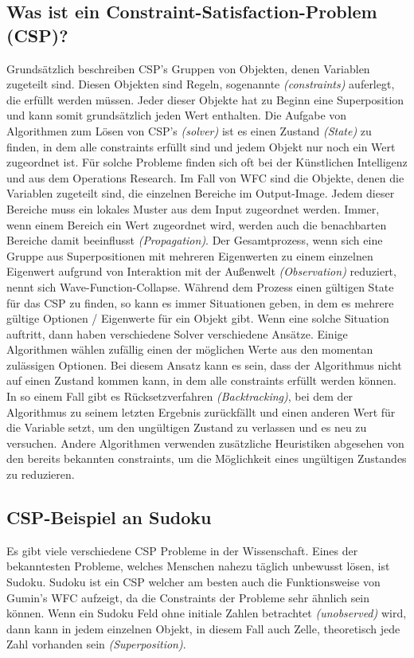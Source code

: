 \documentclass[12pt, a4paper,twoside,openright]{report} %
\begin{document}
\subsection{Was ist ein Constraint-Satisfaction-Problem {(CSP)}?}
Grundsätzlich beschreiben CSP's Gruppen von Objekten, denen Variablen zugeteilt sind.
Diesen Objekten sind Regeln, sogenannte \textit{(constraints)} auferlegt, die erfüllt werden müssen.
Jeder dieser Objekte hat zu Beginn eine Superposition und kann somit grundsätzlich jeden Wert enthalten.
Die Aufgabe von Algorithmen zum Lösen von CSP's \textit{(solver)} ist es einen Zustand \textit{(State)} zu finden,
in dem alle constraints erfüllt sind und jedem Objekt nur noch ein Wert zugeordnet ist.
Für solche Probleme finden sich oft bei der Künstlichen Intelligenz und aus dem Operations Research. \cite{Lecoutre2009ConstraintNT}
Im Fall von WFC sind die Objekte, denen die Variablen zugeteilt sind, die einzelnen Bereiche im Output-Image.
Jedem dieser Bereiche muss ein lokales Muster aus dem Input zugeordnet werden.
Immer, wenn einem Bereich ein Wert zugeordnet wird, werden auch die benachbarten Bereiche damit beeinflusst \textit{(Propagation)}.
Der Gesamtprozess, wenn sich eine Gruppe aus Superpositionen mit mehreren Eigenwerten zu einem einzelnen Eigenwert aufgrund von Interaktion mit der Außenwelt \textit{(Observation)} reduziert,
nennt sich Wave-Function-Collapse. \cite{Zinkernagel_2016}
Während dem Prozess einen gültigen State für das CSP zu finden, so kann es immer Situationen geben, in dem es mehrere gültige Optionen / Eigenwerte für ein Objekt gibt.
Wenn eine solche Situation auftritt, dann haben verschiedene Solver verschiedene Ansätze.
Einige Algorithmen wählen zufällig einen der möglichen Werte aus den momentan zulässigen Optionen.
Bei diesem Ansatz kann es sein, dass der Algorithmus nicht auf einen Zustand kommen kann, in dem alle constraints erfüllt werden können.
In so einem Fall gibt es Rücksetzverfahren \textit{(Backtracking)}, bei dem der Algorithmus zu seinem letzten Ergebnis zurückfällt und einen anderen Wert für die Variable setzt,
um den ungültigen Zustand zu verlassen und es neu zu versuchen.
Andere Algorithmen verwenden zusätzliche Heuristiken abgesehen von den bereits bekannten constraints, um die Möglichkeit eines ungültigen Zustandes zu reduzieren. \cite{Karth2017WaveFunctionCollapseIC}
\pagebreak

\subsection{CSP-Beispiel an Sudoku}
Es gibt viele verschiedene CSP Probleme in der Wissenschaft.
Eines der bekanntesten Probleme, welches Menschen nahezu täglich unbewusst lösen, ist Sudoku.
Sudoku ist ein CSP welcher am besten auch die Funktionsweise von Gumin's WFC aufzeigt, da die Constraints der Probleme sehr ähnlich sein können.
Wenn ein Sudoku Feld ohne initiale Zahlen betrachtet \textit{(unobserved)} wird, dann kann in jedem einzelnen Objekt, in diesem Fall auch Zelle, theoretisch jede Zahl vorhanden sein \textit{(Superposition)}.
\end{document}
